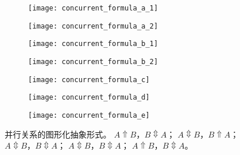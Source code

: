 \begin{figure}[htbp]
  \centering
  \begin{subfigure}[b]{0.45\textwidth}
  	\centering
  	\begin{minipage}[b]{1\textwidth}
  	  \centering
  	  \texttt{[image: concurrent\_formula\_a\_1]}
  	\end{minipage}
  	\begin{minipage}[b]{1\textwidth}
  	  \vspace{1em}
  	  \centering
  	  \texttt{[image: concurrent\_formula\_a\_2]}
  	\end{minipage}
  	\caption{}
  	\label{fig:concurrent_formula_a}
  \end{subfigure}
  \hspace{1em}
  \begin{subfigure}[b]{0.45\textwidth}
  	\centering
  	\begin{minipage}[b]{1\textwidth}
  	  \centering
  	  \texttt{[image: concurrent\_formula\_b\_1]}
  	\end{minipage}
  	\begin{minipage}[b]{1\textwidth}
  	  \vspace{1em}
  	  \centering
  	  \texttt{[image: concurrent\_formula\_b\_2]}
  	\end{minipage}
  	\caption{}
  	\label{fig:concurrent_formula_b}
  \end{subfigure}
  \begin{subfigure}[b]{0.45\textwidth}
  	\vspace{2em}
  	\centering
  	\texttt{[image: concurrent\_formula\_c]}
  	\caption{}
  	\label{fig:concurrent_formula_c}
  \end{subfigure}
  \hspace{1em}
  \begin{subfigure}[b]{0.45\textwidth}
  	\vspace{2em}
  	\centering
  	\texttt{[image: concurrent\_formula\_d]}
  	\caption{}
  	\label{fig:concurrent_formula_d}
  \end{subfigure}
  \begin{subfigure}[b]{0.45\textwidth}
  	\vspace{2em}
  	\centering
  	\texttt{[image: concurrent\_formula\_e]}
  	\caption{}
  	\label{fig:concurrent_formula_e}
  \end{subfigure}
  \vspace{6pt}
  \caption{并行关系的图形化抽象形式。 $A\Uparrow B$，$B\Updownarrow A$； $A\Updownarrow B$，$B\Uparrow A$； $A\Updownarrow B$，$B\Updownarrow A$； $A\Updownarrow B$，$B\Updownarrow A$； $A\Uparrow B$，$B\Updownarrow A$。}
  \label{fig:event_concurrent_formulas}
\end{figure}

